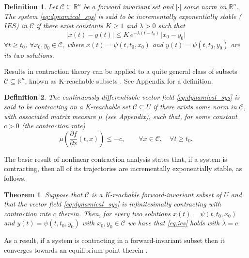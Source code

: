 \documentclass[letterpaper, 10 pt, conference]{ieeeconf}
\newtheorem{theorem}{Theorem}
\newtheorem{definition}{Definition}
\begin{document}
\begin{definition}
\label{def:incr_stability}
Let $\mathcal{C}\subseteq\mathbb{R}^n$ be a forward invariant set and $|\cdot|$ some norm on $\mathbb{R}^n$. The system \eqref{eq:dynamical_sys} is said to be \emph{incrementally exponentially stable} ($IES$) in $\mathcal{C}$ if there exist constants $K\geq 1$ and $\lambda>0$ such that 
\begin{equation}
\label{eq:ies}
\lvert x(t)-y(t)\rvert \leq  K\, e^{-\lambda(t-t_0)}\,\lvert x_0-y_0\rvert 
\end{equation}
$\forall t \geq t_0$, $\forall x_0,y_0 \in \mathcal{C}$, where $x(t)=\psi(t,t_0,x_0)$ and $y(t)=\psi(t,t_0,y_0)$ are its two solutions.
\end{definition}

Results in contraction theory can be applied to a quite general class of subsets $\mathcal{C}\subseteq\mathbb{R}^n$, known as K-reachable subsets \cite{russo2010global}. See Appendix for a definition.

\begin{definition}
\label{def:contraction}
The continuously differentiable vector field \eqref{eq:dynamical_sys} is said to be \emph{contracting} on a K-reachable set $\mathcal{C}\subseteq U$ if there exists some norm in $\mathcal{C}$, with associated matrix measure $\mu$ (see Appendix), such that, for some constant $c>0$ (the \emph{contraction rate})
\begin{equation}
\label{eq:contraction_cond}
\mu\left(\frac{\partial f}{\partial x}(t,x)\right)\leq -c, \quad \quad \forall x\in\mathcal{C},\quad \forall t\geq t_0.
\end{equation}
\end{definition}
\vspace{0.2cm}
The basic result of nonlinear contraction analysis states that, if a system is contracting, then all of its trajectories are incrementally exponentially stable, as follows.
\begin{theorem}
\label{thm:contraction}
Suppose that $\mathcal{C}$ is a K-reachable forward-invariant subset of $U$ and that the vector field \eqref{eq:dynamical_sys} is infinitesimally contracting with contraction rate $c$ therein. Then, for every two solutions $x(t)=\psi(t,t_0,x_0)$ and $y(t)=\psi(t,t_0,y_0)$ with $x_0,y_0\in\mathcal{C}$ we have that \eqref{eq:ies} holds with $\lambda=c$.
\end{theorem}
As a result, if a system is contracting in a forward-invariant subset then it converges towards an equilibrium point therein \cite{russo2010global,lohmiller1998contraction}.
\end{document}
